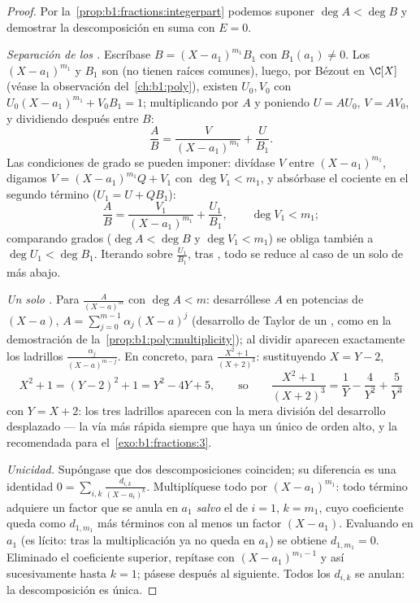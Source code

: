 \begin{proof}
Por la~\cref{prop:b1:fractions:integerpart} podemos suponer
$\deg A < \deg B$ y demostrar la descomposición en suma con $E = 0$.

\emph{Separación de los .} Escríbase $B = (X - a_1)^{m_1} B_1$ con
$B_1(a_1) \neq 0$. Los  $(X-a_1)^{m_1}$ y $B_1$ son
 (no tienen raíces comunes), luego, por Bézout en $\C[X]$
(véase la observación del~\cref{ch:b1:poly}), existen $U_0, V_0$ con
$U_0 (X-a_1)^{m_1} + V_0 B_1 = 1$; multiplicando por $A$ y poniendo
$U = AU_0$, $V = AV_0$, y dividiendo después entre $B$:
\[
\frac AB = \frac{V}{(X - a_1)^{m_1}} + \frac{U}{B_1} .
\]
Las condiciones de grado se pueden imponer: divídase $V$ entre
$(X-a_1)^{m_1}$, digamos $V = (X-a_1)^{m_1}Q + V_1$ con
$\deg V_1 < m_1$, y absórbase el cociente en el segundo término
($U_1 = U + QB_1$):
\[
\frac AB = \frac{V_1}{(X - a_1)^{m_1}} + \frac{U_1}{B_1},
\qquad \deg V_1 < m_1 ;
\]
comparando grados ($\deg A < \deg B$ y $\deg V_1 < m_1$) se obliga
también a $\deg U_1 < \deg B_1$. Iterando sobre $\frac{U_1}{B_1}$,
 tras , todo se reduce al caso de un solo  de más abajo.

\emph{Un solo .} Para $\frac{A}{(X-a)^m}$ con $\deg A < m$:
desarróllese $A$ en potencias de $(X - a)$,
$A = \sum_{j=0}^{m-1} \alpha_j (X - a)^j$ (desarrollo de Taylor de un
, como en la demostración de
la~\cref{prop:b1:poly:multiplicity}); al dividir aparecen exactamente
los ladrillos $\frac{\alpha_j}{(X-a)^{m-j}}$. En concreto, para
$\frac{X^2 + 1}{(X+2)^3}$: sustituyendo $X = Y - 2$,
\[
X^2 + 1 = (Y - 2)^2 + 1 = Y^2 - 4Y + 5 ,
\qquad\text{so}\qquad
\frac{X^2+1}{(X+2)^3} = \frac1{Y} - \frac4{Y^2} + \frac5{Y^3}
\]
con $Y = X + 2$: los tres ladrillos aparecen con la mera división del
desarrollo desplazado --- la vía más rápida siempre que haya un único
 de orden alto, y la recomendada para
el~\cref{exo:b1:fractions:3}.

\emph{Unicidad.} Supóngase que dos descomposiciones coinciden; su
diferencia es una identidad $0 = \sum_{i,k} \frac{d_{i,k}}{(X -
a_i)^k}$. Multiplíquese todo por $(X - a_1)^{m_1}$: todo término
adquiere un factor que se anula en $a_1$ \emph{salvo} el de $i = 1$,
$k = m_1$, cuyo coeficiente queda como $d_{1,m_1}$ más términos con al
menos un factor $(X - a_1)$. Evaluando en $a_1$ (es lícito: tras la
multiplicación ya no queda  en $a_1$) se obtiene $d_{1,m_1} = 0$.
Eliminado el coeficiente superior, repítase con $(X - a_1)^{m_1 - 1}$ y
así sucesivamente hasta $k = 1$; pásese después al  siguiente.
Todos los $d_{i,k}$ se anulan: la descomposición es única.
\end{proof}

